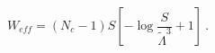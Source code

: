 \begin{equation}
\label{HVY1}
W_{eff}=\left(N_c-1\right) S \left[ -\log{\frac{S}{\tilde{\Lambda}^3}}+1 
\right] ~.
\end{equation}

